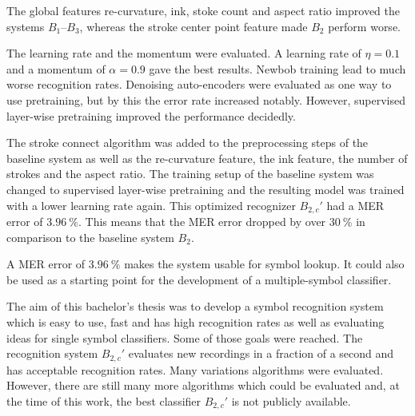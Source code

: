 \documentclass[9pt,technote]{IEEEtran}
\begin{document}
The global features re-curvature, ink, stoke count and aspect ratio improved the
systems $B_1$--$B_3$, whereas the stroke center point feature made $B_2$ perform
worse.

The learning rate and the momentum were evaluated. A learning rate of $\eta=0.1$
and a momentum of $\alpha=0.9$ gave the best results. Newbob training lead to
much worse recognition rates. Denoising auto-encoders were evaluated as one way
to use pretraining, but by this the error rate increased notably. However,
supervised layer-wise pretraining improved the performance decidedly.

The stroke connect algorithm was added to the preprocessing steps of the
baseline system as well as the re-curvature feature, the ink feature, the number
of strokes and the aspect ratio. The training setup of the baseline system was
changed to supervised layer-wise pretraining and the resulting model was trained
with a lower learning rate again. This optimized recognizer $B_{2,c}'$ had a MER
error of $\SI{3.96}{\percent}$. This means that the MER error dropped by over
$\SI{30}{\percent}$ in comparison to the baseline system $B_2$.

A MER error of $\SI{3.96}{\percent}$ makes the system usable for symbol lookup.
It could also be used as a starting point for the development of a
multiple-symbol classifier.

The aim of this bachelor's thesis was to develop a symbol recognition system
which is easy to use, fast and has high recognition rates as well as evaluating
ideas for single symbol classifiers. Some of those goals were reached. The
recognition system $B_{2,c}'$ evaluates new recordings in a fraction of a second
and has acceptable recognition rates. Many variations algorithms were evaluated.
However, there are still many more algorithms which could be evaluated and, at
the time of this work, the best classifier $B_{2,c}'$ is not publicly available.



\end{document}

